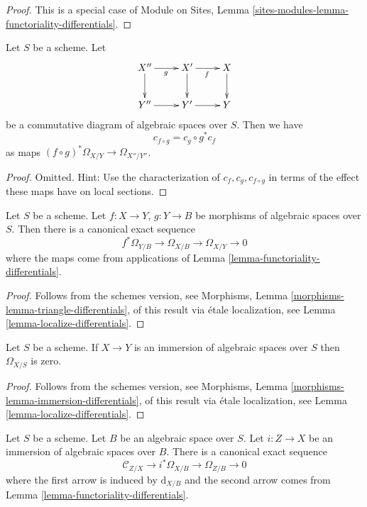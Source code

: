 \begin{proof}
This is a special case of
Module on Sites, Lemma \ref{sites-modules-lemma-functoriality-differentials}.
\end{proof}

\begin{lemma}
\label{lemma-check-functoriality-differentials}
Let $S$ be a scheme. Let
$$
\xymatrix{
X'' \ar[d] \ar[r]_g & X' \ar[d] \ar[r]_f & X \ar[d] \\
Y'' \ar[r] & Y' \ar[r] & Y
}
$$
be a commutative diagram of algebraic spaces over $S$. Then we have
$$
c_{f \circ g} = c_g \circ g^* c_f
$$
as maps $(f \circ g)^*\Omega_{X/Y} \to \Omega_{X''/Y''}$.
\end{lemma}

\begin{proof}
Omitted. Hint: Use the characterization of $c_f, c_g, c_{f \circ g}$
in terms of the effect these maps have on local sections.
\end{proof}

\begin{lemma}
\label{lemma-triangle-differentials}
Let $S$ be a scheme.
Let $f : X \to Y$, $g : Y \to B$ be morphisms of algebraic spaces over $S$.
Then there is a canonical exact sequence
$$
f^*\Omega_{Y/B} \to \Omega_{X/B} \to \Omega_{X/Y} \to 0
$$
where the maps come from applications of
Lemma \ref{lemma-functoriality-differentials}.
\end{lemma}

\begin{proof}
Follows from the schemes version, see
Morphisms, Lemma \ref{morphisms-lemma-triangle-differentials},
of this result via \'etale localization, see
Lemma \ref{lemma-localize-differentials}.
\end{proof}

\begin{lemma}
\label{lemma-immersion-differentials}
Let $S$ be a scheme. If $X \to Y$ is an immersion
of algebraic spaces over $S$ then $\Omega_{X/S}$ is zero.
\end{lemma}

\begin{proof}
Follows from the schemes version, see
Morphisms, Lemma \ref{morphisms-lemma-immersion-differentials},
of this result via \'etale localization, see
Lemma \ref{lemma-localize-differentials}.
\end{proof}

\begin{lemma}
\label{lemma-differentials-relative-immersion}
Let $S$ be a scheme. Let $B$ be an algebraic space over $S$.
Let $i : Z \to X$ be an immersion of algebraic spaces over $B$.
There is a canonical exact sequence
$$
\mathcal{C}_{Z/X} \to i^*\Omega_{X/B} \to \Omega_{Z/B} \to 0
$$
where the first arrow is induced by $\text{d}_{X/B}$
and the second arrow comes from
Lemma \ref{lemma-functoriality-differentials}.
\end{lemma}

